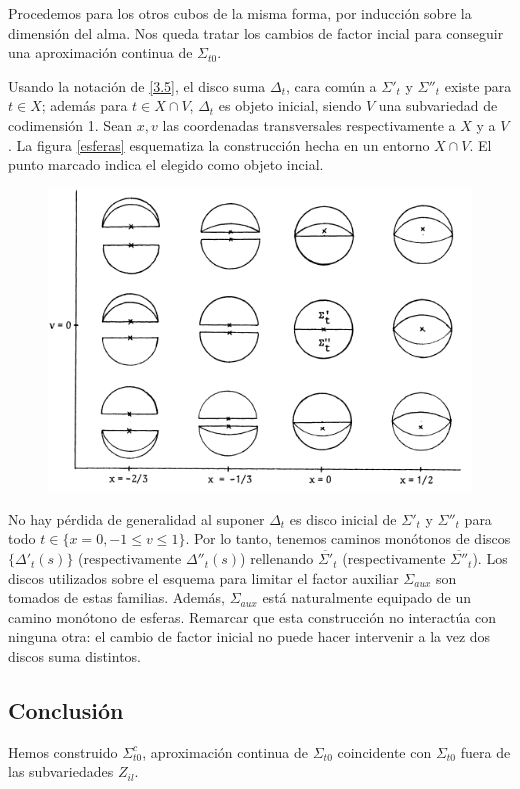 \documentclass[twoside, 11pt]{article}
\begin{document}
Procedemos para los otros cubos de la misma forma, por inducción sobre la dimensión del alma. Nos queda tratar los cambios de factor incial para conseguir una aproximación continua de $\Sigma_{t0}$.

Usando la notación de \ref{3.5}, el disco suma $\Delta_t$, cara común a $\Sigma'_t$ y $\Sigma''_t$ existe para $t\in X$; además para $t\in X\cap V$, $\Delta_t$ es objeto inicial, siendo $V$ una subvariedad de codimensión 1. Sean $x,v$ las coordenadas transversales respectivamente a $X$ y a $V$. La figura \ref{esferas} esquematiza la construcción hecha en un entorno $X\cap V$. El punto marcado indica el elegido como objeto incial. 

\begin{figure}[h!]
\includegraphics[scale=0.7]{esferas}
\end{figure}

No hay pérdida de generalidad al suponer $\Delta_t$ es disco inicial de $\Sigma'_t$ y $\Sigma''_t$ para todo $t\in\{x=0, -1\leq v\leq 1\}$. Por lo tanto, tenemos caminos monótonos de discos $\{\Delta'_t(s)\}$ (respectivamente $\Delta''_t(s)$) rellenando $\overline{\Sigma'}_t$ (respectivamente $\overline{\Sigma''}_t$). Los discos utilizados sobre el esquema para limitar el factor auxiliar $\Sigma_{aux}$ son tomados de estas familias. Además, $\Sigma_{aux}$ está naturalmente equipado de un camino monótono de esferas. Remarcar que esta construcción no interactúa con ninguna otra: el cambio de factor inicial no puede hacer intervenir a la vez dos discos suma distintos. 

\subsection{Conclusión}
Hemos construido $\Sigma_{t0}^c$, aproximación continua de $\Sigma_{t0}$ coincidente con $\Sigma_{t0}$ fuera de las subvariedades $Z_{il}$.
\end{document}

